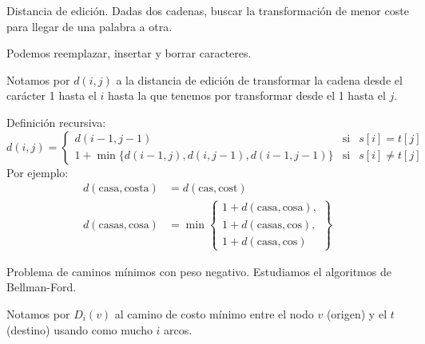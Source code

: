 \begin{ejemplo}
    Distancia de edición. Dadas dos cadenas, buscar la transformación de menor coste para llegar de una palabra a otra.

    Podemos reemplazar, insertar y borrar caracteres.

    \begin{notacion}
        Notamos por $d(i,j)$ a la distancia de edición de transformar la cadena desde el carácter 1 hasta el $i$ hasta la que tenemos por transformar desde el 1 hasta el $j$.
    \end{notacion}
    Definición recursiva:
    \begin{equation*}
        d(i,j) = \left\{\begin{array}{lll}
                d(i-1, j-1) & \text{si} & s[i] = t[j] \\
                1 + \min \{ d(i-1,j),d(i,j-1),d(i-1,j-1)\} & \text{si} & s[i] \neq t[j]
        \end{array}\right.
    \end{equation*}
    Por ejemplo:
    \begin{align*}
        d(\text{casa}, \text{costa}) &= d(\text{cas},\text{cost}) \\
        d(\text{casas}, \text{cosa}) &= \min \left\{ \begin{array}{l}
            1 + d(\text{casa},\text{cosa}), \\
            1 + d(\text{casas}, \text{cos}), \\
            1 + d(\text{casa}, \text{cos})
        \end{array}\right\}
    \end{align*}
\end{ejemplo}

\begin{ejemplo}
    Problema de caminos mínimos con peso negativo. Estudiamos el algoritmos de Bellman-Ford.

    \begin{notacion}
        Notamos por $D_i(v)$ al camino de costo mínimo entre el nodo $v$ (origen) y el $t$ (destino) usando como mucho $i$ arcos.
    \end{notacion}
\end{ejemplo}
